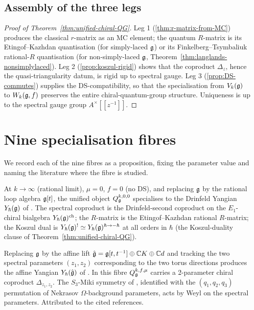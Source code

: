 \subsection{Assembly of the three legs}

\begin{proof}[Proof of Theorem~\ref{thm:unified-chiral-QG}]
Leg 1 (\ref{thm:r-matrix-from-MC}) produces the classical $r$-matrix
as an MC element; the quantum $R$-matrix is its Etingof--Kazhdan
quantisation (for simply-laced $\mathfrak{g}$) or its Finkelberg--Tsymbaliuk
rational-$R$ quantisation (for non-simply-laced $\mathfrak{g}$,
Theorem~\ref{thm:langlands-nonsimplylaced}). Leg 2
(\ref{prop:koszul-rigid}) shows that the coproduct
$\Delta_z$, hence the quasi-triangularity datum, is rigid up to
spectral gauge. Leg 3 (\ref{prop:DS-commutes}) supplies the
DS-compatibility, so that the specialisation from
$V_k(\mathfrak{g})$ to $W_k(\mathfrak{g}, f)$ preserves the entire chiral-quantum-group
structure. Uniqueness is up to the spectral gauge group
$A^{\times}[\![z^{-1}]\!]$.
\end{proof}

\section{Nine specialisation fibres}
\label{sec:ucqg-fibres}

We record each of the nine fibres as a proposition, fixing the
parameter value and naming the literature where the fibre is studied.

\begin{proposition}[Yangian]
\label{prop:fibre-yangian}
\ClaimStatusProvedHere
At $k\to\infty$ (rational limit), $\mu = 0$, $f = 0$ (no DS), and
replacing $\mathfrak{g}$ by the rational loop algebra $\mathfrak{g}[t]$, the unified
object $Q_{\mathfrak{g}}^{k,0,0}$ specialises to the Drinfeld Yangian
$Y_{\hbar}(\mathfrak{g})$ of \cite{Drinfeld85}. The spectral coproduct is the
Drinfeld-second coproduct on the $E_1$-chiral bialgebra
$Y_{\hbar}(\mathfrak{g})^{\mathrm{ch}}$; the $R$-matrix is the Etingof--Kazhdan
rational $R$-matrix; the Koszul dual is $Y_{\hbar}(\mathfrak{g})^{!} \simeq
Y_{\hbar}(\mathfrak{g})^{\hbar\to -\hbar}$ at all orders in $\hbar$
(the Koszul-duality clause of Theorem~\ref{thm:unified-chiral-QG}).
\end{proposition}

\begin{proposition}
\label{prop:fibre-affine-yangian}
\ClaimStatusProvedElsewhere
Replacing $\mathfrak{g}$ by the affine lift $\hat{\mathfrak{g}} = \mathfrak{g}[t,t^{-1}]\oplus
\mathbb{C} K\oplus \mathbb{C} d$ and tracking the two spectral
parameters $(z_1, z_2)$ corresponding to the two torus directions
produces the affine Yangian $Y_{\hbar}(\hat{\mathfrak{g}})$ of
\cite{GuayNakajimaWendlandt18,Bezerra-Futorny-Feingold19}. In this
fibre $Q_{\mathfrak{g}}^{k,f,\mu}$ carries a 2-parameter chiral coproduct
$\Delta_{z_1,z_2}$. The $S_3$-Miki symmetry of
\cite{Miki07}, identified with the $(q_1, q_2, q_3)$ permutation of
Nekrasov $\Omega$-background parameters, acts by Weyl on the spectral
parameters. Attributed to the cited references.
\end{proposition}

